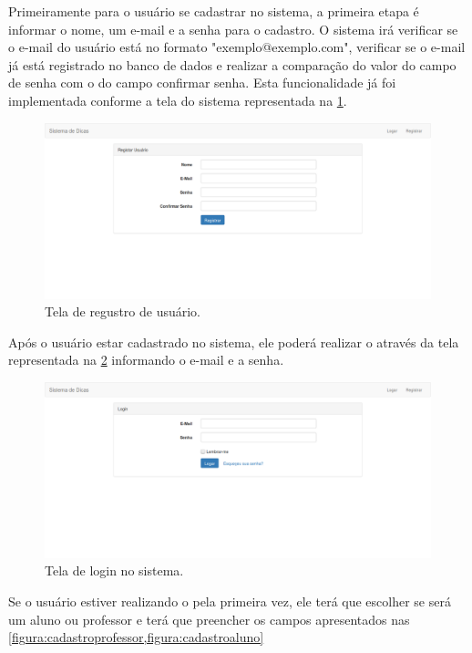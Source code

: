 Primeiramente para o usuário se cadastrar no sistema, a primeira etapa é informar o nome, um e-mail e a senha para o cadastro. O sistema irá verificar se o e-mail do usuário está no formato "exemplo@exemplo.com", verificar se o e-mail já está registrado no banco de dados e realizar a comparação do valor do campo de senha com o do campo confirmar senha. Esta funcionalidade já foi implementada conforme a tela do sistema representada na \cref{figura:registrarusuario}.

\begin{figure}[]
	\captionsetup{justification=centering}
	\includegraphics[width=\linewidth]{imagenssoftware/registrarusuario.png}
	\caption{Tela de regustro de usuário.}
	\label{figura:registrarusuario}
\end{figure}

Após o usuário estar cadastrado no sistema, ele poderá realizar o  através da tela representada na \cref{figura:logar} informando o e-mail e a senha.

\begin{figure}[]
	\captionsetup{justification=centering}
	\includegraphics[width=\linewidth]{imagenssoftware/logar.png}
	\caption{Tela de login no sistema.}
	\label{figura:logar}
\end{figure}

Se o usuário estiver realizando o  pela primeira vez, ele terá que escolher se será um aluno ou professor e terá que preencher os campos apresentados nas \cref{figura:cadastroprofessor,figura:cadastroaluno}

